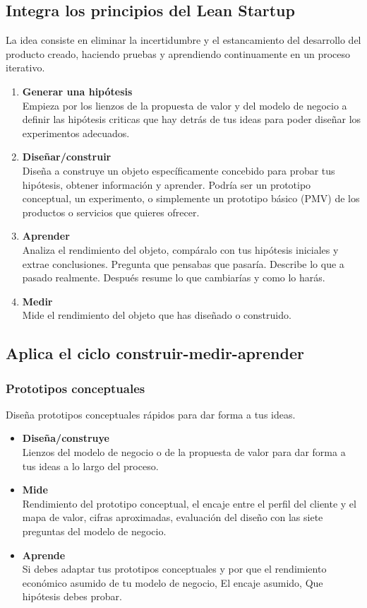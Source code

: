 \documentclass[11pt]{book}
\begin{document}
\subsection{Integra los principios del Lean Startup}
La idea consiste en eliminar la incertidumbre y el estancamiento del desarrollo del producto creado, haciendo pruebas y aprendiendo continuamente en un proceso iterativo.
\begin{enumerate}
\item \textbf{ Generar una hipótesis }\\
Empieza por los lienzos de la propuesta de valor y del modelo de negocio a definir las hipótesis criticas que hay detrás de tus ideas para poder diseñar los experimentos adecuados.
\item \textbf{ Diseñar/construir }\\
Diseña a construye un objeto específicamente concebido para probar tus hipótesis, obtener información y aprender. Podría ser un prototipo conceptual, un experimento, o simplemente un prototipo básico (PMV) de los productos o servicios que quieres ofrecer. 
\item \textbf{ Aprender }\\
Analiza el rendimiento del objeto, compáralo con tus hipótesis iniciales y extrae conclusiones. Pregunta que pensabas que pasaría. Describe lo que a pasado realmente. Después resume lo que cambiarías y como lo harás. 
\item \textbf{ Medir }\\
Mide el rendimiento del objeto que has diseñado o construido.
\end{enumerate}
\subsection{Aplica el ciclo construir-medir-aprender}
\subsubsection{Prototipos conceptuales}
Diseña prototipos conceptuales rápidos para dar forma a tus ideas. 
\begin{itemize}
\item \textbf{ Diseña/construye }\\
Lienzos del modelo de negocio o de la propuesta de valor para dar forma a tus ideas a lo largo del proceso.
\item \textbf{ Mide }\\
Rendimiento del prototipo conceptual, el encaje entre el perfil del cliente y el mapa de valor, cifras aproximadas, evaluación del diseño con las siete preguntas del modelo de negocio.
\item \textbf{ Aprende }\\
Si debes adaptar tus prototipos conceptuales y por que el rendimiento económico asumido de tu modelo de negocio, El encaje asumido, Que hipótesis debes probar.
\end{itemize}
\end{document}
